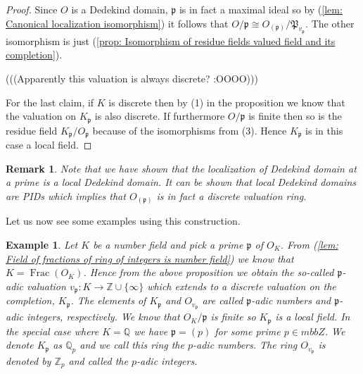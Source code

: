 \documentclass{article}
\DeclareMathOperator{\Frac}{Frac}
\newtheorem{example}{Example}[section]
\newtheorem{remark}{Remark}[section]
\newcommand{\mfrak}[1]{\mathfrak{#1}}
\newcommand{\mbb}[1]{\mathbb{#1}}
\newcommand{\vp}{{v_{\mfrak p}}}
\begin{document}
\begin{proof}
    
    Since $O$ is a Dedekind domain, $\mfrak p$ is in fact a maximal ideal so by (\ref{lem: Canonical localization isomorphism}) it follows that $O / \mfrak p \cong O_{(\mfrak p)} / \mfrak P_\vp$. The other isomorphism is just (\ref{prop: Isomorphism of residue fields valued field and its completion}).
    
    
    (((Apparently this valuation is always discrete? :OOOO)))

    For the last claim, if $K$ is discrete then by (1) in the proposition we know that the valuation on $K_\mfrak p$ is also discrete. If furthermore $O / \mfrak p$ is finite then so is the residue field $K_\mfrak p / O_\mfrak p$ because of the isomorphisms from (3). Hence $K_\mfrak p$ is in this case a local field.
\end{proof}

\begin{remark}
    Note that we have shown that the localization of Dedekind domain at a prime is a local Dedekind domain. It can be shown that local Dedekind domains are PIDs which implies that $O_{(\mfrak p)}$ is in fact a discrete valuation ring.
\end{remark}
    
Let us now see some examples using this construction. 

\begin{example}\label{ex: P-adic numbers}
    Let $K$ be a number field and pick a prime $\mfrak p$ of $O_K$. From (\ref{lem: Field of fractions of ring of integers is number field}) we know that $K = \Frac(O_K)$. Hence from the above proposition we obtain the so-called $\mfrak p$-adic valuation $v_\mfrak p : K \to \mbb Z \cup \{\infty \}$ which extends to a discrete valuation on the completion, $K_\mfrak p$. The elements of $K_\mfrak p$ and $O_\vp$ are called $\mfrak p$-adic numbers and $\mfrak p$-adic integers, respectively. We know that $O_K / \mfrak p$ is finite so $K_\mfrak p$ is a local field. In the special case where $K = \mbb Q$ we have $\mfrak p = (p)$ for some prime $p \in mbb Z$. We denote $K_\mfrak p$ as $\mbb Q_p$ and we call this ring the $p$-adic numbers. The ring $O_\vp$ is denoted by $\mbb Z_p$ and called the $p$-adic integers.
\end{example}
\end{document}
